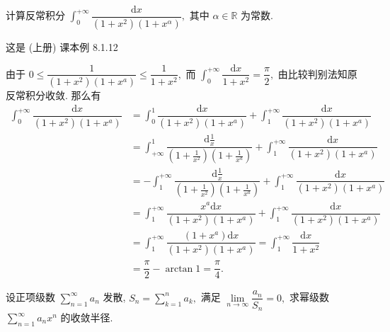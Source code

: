 
\begin{question}[points = 10]
计算反常积分 $\int_0^{+\infty} \dfrac{\mathrm{d} x}{(1+x^2)(1+x^{\alpha})},$ 其中 $\alpha \in \mathbb{R}$ 为常数.

\end{question}

\begin{solution}
这是 (上册) 课本例 8.1.12

由于 $0 \leqslant \dfrac{1}{(1 + x^2)(1 + x^a)} \leqslant \dfrac{1}{1 + x^2},$ 而 $\int_0^{+\infty} \dfrac{\mathrm{d} x}{1 + x^2} = \dfrac{\pi}{2},$ 由比较判别法知原反常积分收敛. 那么有
\begin{align*}
\int_0^{+\infty} \dfrac{\mathrm{d} x}{(1 + x^2)(1 + x^a)} & = \int_0^1 \dfrac{\mathrm{d} x}{(1 + x^2)(1 + x^a)} + \int_1^{+\infty} \dfrac{\mathrm{d} x}{(1 + x^2)(1 + x^a)} \\
& = \int_{+\infty}^1 \dfrac{\mathrm{d} \frac{1}{x}}{(1 + \frac{1}{x^2})(1 + \frac{1}{x^a})} + \int_1^{+\infty} \dfrac{\mathrm{d} x}{(1 + x^2)(1 + x^a)} \\
& = -\int_1^{+\infty} \dfrac{\mathrm{d} \frac{1}{x}}{(1 + \frac{1}{x^2})(1 + \frac{1}{x^a})} + \int_1^{+\infty} \dfrac{\mathrm{d} x}{(1 + x^2)(1 + x^a)} \\
& = \int_1^{+\infty} \dfrac{x^a \mathrm{d} x}{(1 + x^2)(1 + x^a)} + \int_1^{+\infty} \dfrac{\mathrm{d} x}{(1 + x^2)(1 + x^a)} \\
& = \int_1^{+\infty} \dfrac{(1 + x^a) \mathrm{d} x}{(1 + x^2)(1 + x^a)} = \int_1^{+\infty} \dfrac{\mathrm{d} x}{1 + x^2} \\
& = \dfrac{\pi}{2} - \arctan 1 = \dfrac{\pi}{4}.
\end{align*}
\end{solution}

\begin{question}[points = 10]
设正项级数 $\sum\limits_{n=1}^{\infty} a_n$ 发散, $S_n = \sum\limits_{k=1}^{n} a_k,$ 满足 $\lim\limits_{n\to\infty} \dfrac{a_n}{S_n} = 0,$ 求幂级数 $\sum\limits_{n=1}^{\infty} a_n x^n$ 的收敛半径.

\end{question}

